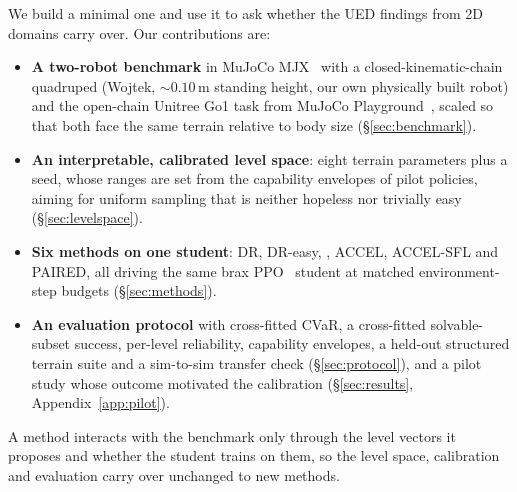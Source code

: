We build a minimal one and use it to ask whether the UED findings from 2D
domains carry over. Our contributions are:
\begin{itemize}
  \item \textbf{A two-robot benchmark} in MuJoCo MJX~\citep{todorov2012mujoco}
    with a closed-kinematic-chain quadruped (Wojtek, ${\sim}0.10$\,m
    standing height, our own physically built robot) and the open-chain
    Unitree Go1 task from MuJoCo Playground~\citep{zakka2025playground},
    scaled so that both face the same terrain relative to body size
    (\S\ref{sec:benchmark}).
  \item \textbf{An interpretable, calibrated level space}: eight terrain
    parameters plus a seed, whose ranges are set from the capability
    envelopes of pilot policies, aiming for uniform sampling that is
    neither hopeless nor trivially easy (\S\ref{sec:levelspace}).
  \item \textbf{Six methods on one student}: DR, DR-easy, \plr, ACCEL,
    ACCEL-SFL and PAIRED, all driving the same brax
    PPO~\citep{schulman2017ppo,freeman2021brax} student at matched
    environment-step budgets (\S\ref{sec:methods}).
  \item \textbf{An evaluation protocol} with cross-fitted CVaR, a
    cross-fitted solvable-subset success, per-level reliability,
    capability envelopes, a held-out structured terrain suite and a
    sim-to-sim transfer check (\S\ref{sec:protocol}), and a pilot study
    whose outcome motivated the calibration (\S\ref{sec:results},
    Appendix~\ref{app:pilot}).
\end{itemize}
A method interacts with the benchmark only through the level vectors it
proposes and whether the student trains on them, so the level space,
calibration and evaluation carry over unchanged to new methods.
